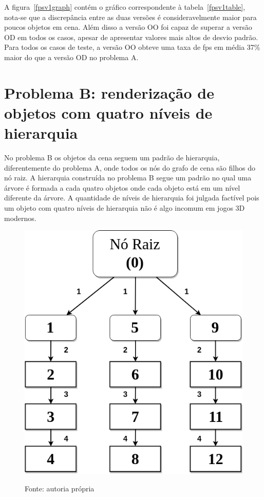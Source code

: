 A figura~\ref{fpsv1graph} contém o gráfico correspondente à tabela~\ref{fpsv1table},
nota-se que a discrepância entre as duas versões é consideravelmente maior para 
poucos objetos em cena. Além disso a versão OO foi capaz de superar a versão 
OD em todos os casos, apesar de apresentar valores mais altos de desvio padrão. 
Para todos os casos de teste, a versão OO obteve uma taxa de fps em média 37\% 
maior do que a versão OD no problema A.

\section{Problema B: renderização de objetos com quatro níveis de hierarquia}

No problema B os objetos da cena seguem um padrão de hierarquia, 
diferentemente do problema A, onde todos os nós do grafo de cena 
são filhos do nó raiz. A hierarquia construída no problema B segue 
um padrão no qual uma árvore é formada a cada quatro objetos onde 
cada objeto está em um nível diferente da árvore. A quantidade de 
níveis de hierarquia foi julgada factível pois um objeto com 
quatro níveis de hierarquia não é algo incomum em jogos 3D modernos.

\begin{figure}[h]
    \centering
    \includegraphics[width =.7\textwidth]{../figuras/problemBscheme}
    \par\medskip
    Fonte: autoria própria
    \label{problemBscheme}
\end{figure}

